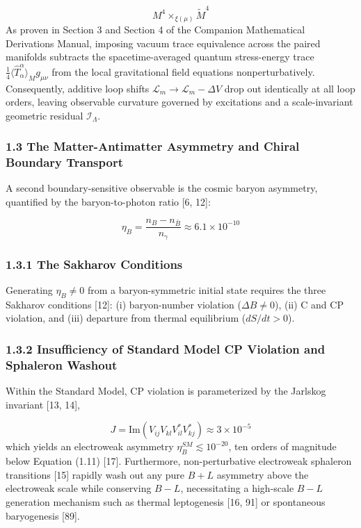 \documentclass[aps,prd,onecolumn,superscriptaddress,nofootinbib,longbibliography,10pt]{revtex4-2}
\begin{document}
  \[ M^4 \times_{\xi(\mu)} \tilde{M}^4 \]
  As proven in Section 3 and Section 4 of the Companion Mathematical Derivations Manual, imposing vacuum trace equivalence across the paired manifolds subtracts the spacetime-averaged quantum stress-energy trace \(\frac{1}{4}\langle \hat{T}^\alpha_\alpha \rangle_M g_{\mu\nu}\) from the local gravitational field equations nonperturbatively. Consequently, additive loop shifts \(\mathcal{L}_m \to \mathcal{L}_m - \Delta V\) drop out identically at all loop orders, leaving observable curvature governed by excitations and a scale-invariant geometric residual \(\mathcal{I}_\Lambda\).



  
\subsubsection*{1.3 The Matter-Antimatter Asymmetry and Chiral Boundary Transport}

  A second boundary-sensitive observable is the cosmic baryon asymmetry, quantified by the baryon-to-photon ratio [6, 12]:


  \[ \eta_B = \frac{n_B - n_{\bar{B}}}{n_\gamma} \approx 6.1 \times 10^{-10} \]
  
\subsubsection*{1.3.1 The Sakharov Conditions}

  Generating \(\eta_B \neq 0\) from a baryon-symmetric initial state requires the three Sakharov conditions [12]: (i) baryon-number violation (\(\Delta B \neq 0\)), (ii) C and CP violation, and (iii) departure from thermal equilibrium (\(dS/dt > 0\)).


  
\subsubsection*{1.3.2 Insufficiency of Standard Model CP Violation and Sphaleron Washout}

  Within the Standard Model, CP violation is parameterized by the Jarlskog invariant [13, 14],


  \[ J = \text{Im}(V_{ij} V_{kl} V_{il}^* V_{kj}^*) \approx 3 \times 10^{-5} \]
  which yields an electroweak asymmetry \(\eta_B^{SM} \lesssim 10^{-20}\), ten orders of magnitude below Equation (1.11) [17]. Furthermore, non-perturbative electroweak sphaleron transitions [15] rapidly wash out any pure \(B+L\) asymmetry above the electroweak scale while conserving \(B-L\), necessitating a high-scale \(B-L\) generation mechanism such as thermal leptogenesis [16, 91] or spontaneous baryogenesis [89].
\end{document}
